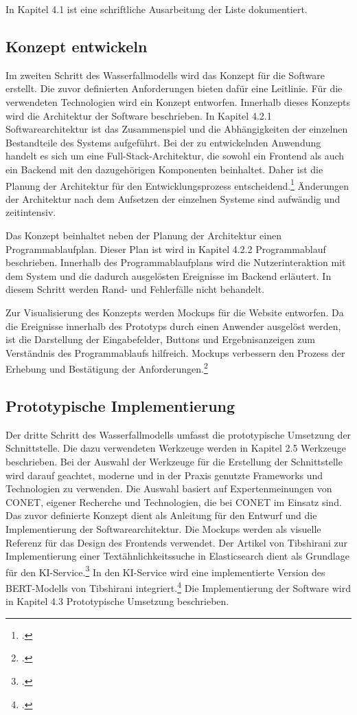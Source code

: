 In Kapitel 4.1 ist eine schriftliche Ausarbeitung der Liste dokumentiert.

\subsection{Konzept entwickeln}
Im zweiten Schritt des Wasserfallmodells wird das Konzept für die Software erstellt. Die zuvor definierten Anforderungen bieten dafür eine Leitlinie. Für die verwendeten Technologien wird ein Konzept entworfen. Innerhalb dieses Konzepts wird die Architektur der Software beschrieben. In Kapitel 4.2.1 \glqq Softwarearchitektur\grqq{} ist das Zusammenspiel und die Abhängigkeiten der einzelnen Bestandteile des Systems aufgeführt. Bei der zu entwickelnden Anwendung handelt es sich um eine Full-Stack-Architektur, die sowohl ein Frontend als auch ein Backend mit den dazugehörigen Komponenten beinhaltet. Daher ist die Planung der Architektur für den Entwicklungsprozess entscheidend.\footcite{taivalsaari2021full} Änderungen der Architektur nach dem Aufsetzen der einzelnen Systeme sind aufwändig und zeitintensiv.

Das Konzept beinhaltet neben der Planung der Architektur einen Programmablaufplan. Dieser Plan ist wird in Kapitel 4.2.2 \glqq Programmablauf\grqq{} beschrieben. Innerhalb des Programmablaufplans wird die Nutzerinteraktion mit dem System und die dadurch ausgelösten Ereignisse im Backend erläutert. In diesem Schritt werden Rand- und Fehlerfälle nicht behandelt.

Zur Visualisierung des Konzepts werden Mockups für die Website entworfen. Da die Ereignisse innerhalb des Prototyps durch einen Anwender ausgelöst werden, ist die Darstellung der Eingabefelder, Buttons und Ergebnisanzeigen zum Verständnis des Programmablaufs hilfreich. Mockups verbessern den Prozess der Erhebung und Bestätigung der Anforderungen.\footcite{rivero2010mockups}

\subsection{Prototypische Implementierung}
Der dritte Schritt des Wasserfallmodells umfasst die prototypische Umsetzung der Schnittstelle. Die dazu verwendeten Werkzeuge werden in Kapitel 2.5 \glqq Werkzeuge\grqq{} beschrieben. Bei der Auswahl der Werkzeuge für die Erstellung der Schnittstelle wird darauf geachtet, moderne und in der Praxis genutzte Frameworks und Technologien zu verwenden. Die Auswahl basiert auf Expertenmeinungen von CONET, eigener Recherche und Technologien, die bei CONET im Einsatz sind. Das zuvor definierte Konzept dient als Anleitung für den Entwurf und die Implementierung der Softwarearchitektur. Die Mockups werden als visuelle Referenz für das Design des Frontends verwendet. Der Artikel von Tibshirani zur Implementierung einer Textähnlichkeitssuche in Elasticsearch dient als Grundlage für den KI-Service.\footcite{tibshirani2019ki} In den KI-Service wird eine implementierte Version des BERT-Modells von Tibshirani integriert.\footcite{tibshirani2020github} Die Implementierung der Software wird in Kapitel 4.3 \glqq Prototypische Umsetzung\grqq{} beschrieben.

